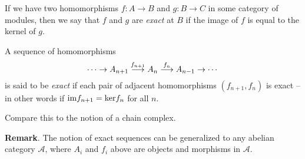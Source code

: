 \documentclass{article}
\begin{document}
If we have two homomorphisms $f : A \to B$ and $g : B \to C$
in some category of modules,
then we say that $f$ and $g$ are {\it exact} at $B$
if the image of $f$ is equal to the kernel of $g$.

A sequence of homomorphisms
$$
  \cdots \rightarrow
  A_{n+1} \buildrel {f_{n+1}} \over \longrightarrow
  A_n \buildrel {f_n} \over \longrightarrow
  A_{n-1} \rightarrow
  \cdots
$$
is said to be {\it exact} if each pair
of adjacent homomorphisms $(f_{n+1}, f_n)$ is exact -- 
in other words if ${\rm im} f_{n+1} = {\rm ker} f_n$ for all $n$.

Compare this to the notion of a chain complex.

\textbf{Remark}.  The notion of exact sequences can be generalized to any abelian category $\mathcal{A}$, where $A_i$ and $f_i$ above are objects and morphisms in $\mathcal{A}$.
\end{document}
